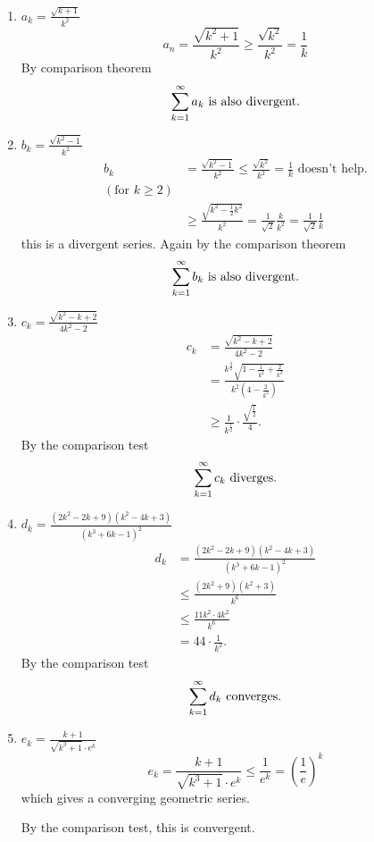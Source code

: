 \documentclass[10pt, a4paper]{article}
\begin{document}
\begin{example}\phantom{}
    \begin{enumerate}[label = \alph*)]
        \item $a_k = \frac{\sqrt{k + 1}}{k ^ 2}$
        \[
        a_n = \frac{\sqrt{k ^ 2 + 1}}{k ^ 2} \geq \frac{\sqrt{k ^ 2}}{k ^ 2} = \frac{1}{k}
        \]
        By comparison theorem
        \[
        \sum_{k = 1}^{\infty} a_k\text{ is also divergent}.
        \]
        \item $b_k = \frac{\sqrt{k ^ 2 - 1}}{k ^ 2}$
        \begin{align*}
        b_k &= \frac{\sqrt{k ^ 2 - 1}}{k ^ 2} \leq \frac{\sqrt{k ^ 2}}{k ^ 2} = \frac{1}{k}\text{ doesn't help.} \\
        (\text{for $k \geq 2$}) \\
        &\geq \frac{\sqrt{k ^ 2 - \frac{1}{2}k ^ 2}}{k ^ 2} = \frac{1}{\sqrt{2}} \frac{k}{k ^ 2} = \frac{1}{\sqrt{2}}\frac{1}{k}
        \end{align*}
        this is a divergent series.
        Again by the comparison theorem
        \[
        \sum_{k = 1}^{\infty} b_k \text{ is also divergent}.
        \]
        \item $c_k = \frac{\sqrt{k ^ 2 - k + 2}}{4k ^ 2 - 2}$
        \begin{align*}
            c_k &= \frac{\sqrt{k ^ 2 - k + 2}}{4k ^ 2 - 2} \\
            &= \frac{k ^ {\frac{3}{2}}\sqrt{1 - \frac{1}{k ^ 2} + \frac{2}{k ^ 3}}}{k ^ 2\left(4 - \frac{2}{k ^ 2}\right)} \\
            &\geq \frac{1}{k ^ {\frac{1}{2}}} \cdot \frac{\sqrt{\frac{1}{2}}}{4}.
        \end{align*}
        By the comparison test
        \[
        \sum_{k = 1}^{\infty} c_k\text{ diverges}.
        \]
        \item $d_k = \frac{(2k ^ 2 - 2k + 9)(k ^ 2 - 4k + 3)}{(k ^ 3 + 6k - 1) ^ 2}$
        \begin{align*}
            d_k &= \frac{(2k ^ 2 - 2k + 9)(k ^ 2 - 4k + 3)}{(k ^ 3 + 6k - 1) ^ 2} \\
            &\leq \frac{(2k ^ 2 + 9)(k ^ 2 + 3)}{k ^ 6} \\
            &\leq \frac{11k ^ 2 \cdot 4k ^ 2}{k ^ 6} \\
            &= 44 \cdot \frac{1}{k ^ 2}.
        \end{align*}
        By the comparison test
        \[
        \sum_{k = 1}^{\infty} d_k\text{ converges}.
        \]
        \item $e_k = \frac{k + 1}{\sqrt{k ^ 3 + 1} \cdot e ^ k}$
        \[
        e_k = \frac{k + 1}{\sqrt{k ^ 3 + 1}\cdot e ^ k} \leq \frac{1}{e ^ k} = \left(\frac{1}{e}\right) ^ k
        \]
        which gives a converging geometric series.

        By the comparison test,
        this is convergent.
    \end{enumerate}
\end{example}
\end{document}
